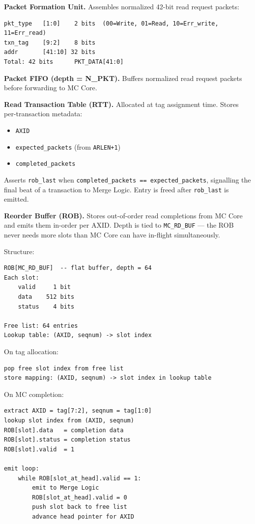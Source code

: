 \documentclass[11pt, a4paper]{article}
\begin{document}
\textbf{Packet Formation Unit.}
Assembles normalized 42-bit read request packets:
\begin{lstlisting}
pkt_type   [1:0]    2 bits  (00=Write, 01=Read, 10=Err_write, 11=Err_read)
txn_tag    [9:2]    8 bits
addr       [41:10] 32 bits
Total: 42 bits      PKT_DATA[41:0]
\end{lstlisting}

\textbf{Packet FIFO (depth = N\_PKT).}
Buffers normalized read request packets before forwarding to MC Core.

\textbf{Read Transaction Table (RTT).}
Allocated at tag assignment time. Stores per-transaction metadata:
\begin{itemize}[noitemsep]
    \item \texttt{AXID}
    \item \texttt{expected\_packets} (from \texttt{ARLEN+1})
    \item \texttt{completed\_packets}
\end{itemize}
Asserts \texttt{rob\_last} when \texttt{completed\_packets == expected\_packets}, signalling the final beat of a transaction to Merge Logic. Entry is freed after \texttt{rob\_last} is emitted.

\textbf{Reorder Buffer (ROB).}
Stores out-of-order read completions from MC Core and emits them in-order per AXID. Depth is tied to \texttt{MC\_RD\_BUF} — the ROB never needs more slots than MC Core can have in-flight simultaneously.

Structure:
\begin{lstlisting}
ROB[MC_RD_BUF]  -- flat buffer, depth = 64
Each slot:
    valid     1 bit
    data    512 bits
    status    4 bits

Free list: 64 entries
Lookup table: (AXID, seqnum) -> slot index
\end{lstlisting}

On tag allocation:
\begin{lstlisting}
pop free slot index from free list
store mapping: (AXID, seqnum) -> slot index in lookup table
\end{lstlisting}

On MC completion:
\begin{lstlisting}
extract AXID = tag[7:2], seqnum = tag[1:0]
lookup slot index from (AXID, seqnum)
ROB[slot].data   = completion data
ROB[slot].status = completion status
ROB[slot].valid  = 1

emit loop:
    while ROB[slot_at_head].valid == 1:
        emit to Merge Logic
        ROB[slot_at_head].valid = 0
        push slot back to free list
        advance head pointer for AXID
\end{lstlisting}
\end{document}
